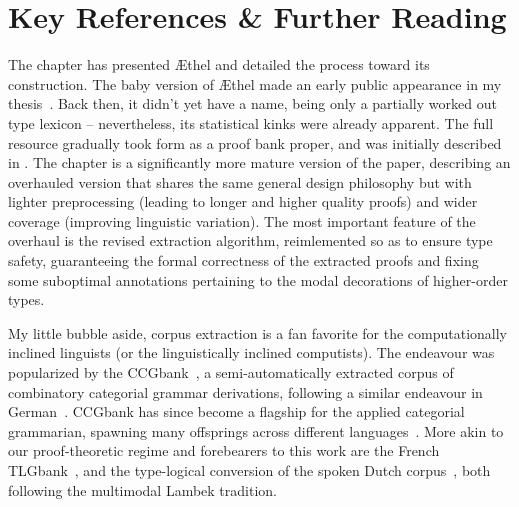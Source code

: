 \section{Key References \& Further Reading}
\label{section:references_3}
The chapter has presented \AE thel and detailed the process toward its construction.
The baby version of \AE thel made an early public appearance in my thesis~\cite{https://doi.org/10.48550/arxiv.1909.02955}.
Back then, it didn't yet have a name, being only a partially worked out type lexicon -- nevertheless, its statistical kinks were already apparent.
The full resource gradually took form as a proof bank proper, and was initially described in \citet{kogkalidis-etal-2020-aethel}.
The chapter is a significantly more mature version of the paper, describing an overhauled version that shares the same general design philosophy but with lighter preprocessing (leading to longer and higher quality proofs) and wider coverage (improving linguistic variation).
The most important feature of the overhaul is the revised extraction algorithm, reimlemented so as to ensure type safety, guaranteeing the formal correctness of the extracted proofs and fixing some suboptimal annotations pertaining to the modal decorations of higher-order types.

My little bubble aside, corpus extraction is a fan favorite for the computationally inclined linguists (or the linguistically inclined computists).
The endeavour was popularized by the CCGbank~\cite{10.1162/coli.2007.33.3.355}, a semi-automatically extracted corpus of combinatory categorial grammar derivations, following a similar endeavour in German~\cite{hockenmaier2006creating}.
CCGbank has since become a flagship for the applied categorial grammarian, spawning many offsprings across different languages~\cite[inter alia]{johan2009converting,tse2010chinese,ambati2018hindi}.
More akin to our proof-theoretic regime and forebearers to this work are the French TLGbank~\cite{moot:inria-00494062}, and the type-logical conversion of the spoken Dutch corpus~\cite{moot2010extraction}, both following the multimodal Lambek tradition.




